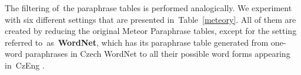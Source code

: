 \documentclass[11pt]{article}
\def \xxx#1{\textbf{\textcolor{red}{xxx: #1}}}
\def\Tref#1{Table~\ref{#1}}
\begin{document}
\begin{table}[tb]
\begin{center}

\caption{Different paraphrase tables for Meteor and their size (number of paraphrase pairs).}
\label{meteory}
\end{center}
\end{table}

The filtering of~the paraphrase tables is performed analogically. We experiment
with six different settings that are presented in~\Tref{meteory}. All of them
are created by reducing the original Meteor Paraphrase tables, except for the 
setting referred to~as~\textbf{WordNet}, which has its paraphrase table 
generated from one-word paraphrases in Czech WordNet to all their possible 
word forms appearing in~CzEng \cite{czeng}.
%
\end{document}
